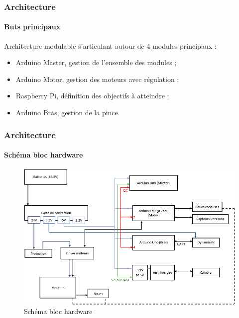 \begin{frame}
\frametitle{Architecture}
\framesubtitle{Buts principaux}
Architecture modulable s'articulant autour de 4 modules principaux :
\begin{itemize}
	\item Arduino Master, gestion de l'ensemble des modules ;
	\item Arduino Motor, gestion des moteurs avec régulation ;
	\item Raspberry Pi, définition des objectifs à atteindre ;
	\item Arduino Bras, gestion de la pince.
\end{itemize}
\end{frame}

\begin{frame}
\frametitle{Architecture}
\framesubtitle{Schéma bloc hardware}
\begin{figure}[!ht]
	\centering
	\includegraphics[scale=0.45]{hardware.PNG}
	\caption{Schéma bloc hardware}
\end{figure}
\end{frame}